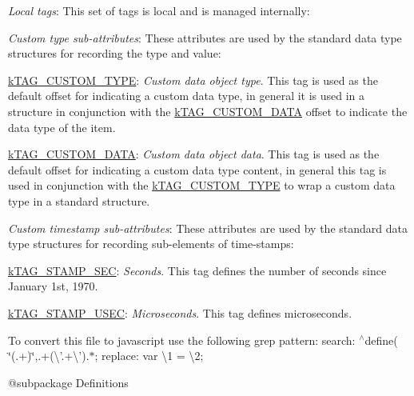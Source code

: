\begin{DoxyItemize}
\begin{DoxyItemize}
\end{DoxyItemize}
\item {\itshape Local tags}\-: This set of tags is local and is managed internally\-: 
\begin{DoxyItemize}
\item {\itshape Custom type sub-\/attributes}\-: These attributes are used by the standard data type structures for recording the type and value\-: 
\begin{DoxyItemize}
\item {\ttfamily \hyperlink{}{k\-T\-A\-G\-\_\-\-C\-U\-S\-T\-O\-M\-\_\-\-T\-Y\-P\-E}}\-: {\itshape Custom data object type}. This tag is used as the default offset for indicating a custom data type, in general it is used in a structure in conjunction with the \hyperlink{}{k\-T\-A\-G\-\_\-\-C\-U\-S\-T\-O\-M\-\_\-\-D\-A\-T\-A} offset to indicate the data type of the item. 
\item {\ttfamily \hyperlink{}{k\-T\-A\-G\-\_\-\-C\-U\-S\-T\-O\-M\-\_\-\-D\-A\-T\-A}}\-: {\itshape Custom data object data}. This tag is used as the default offset for indicating a custom data type content, in general this tag is used in conjunction with the \hyperlink{}{k\-T\-A\-G\-\_\-\-C\-U\-S\-T\-O\-M\-\_\-\-T\-Y\-P\-E} to wrap a custom data type in a standard structure. 
\end{DoxyItemize}
\item {\itshape Custom timestamp sub-\/attributes}\-: These attributes are used by the standard data type structures for recording sub-\/elements of time-\/stamps\-: 
\begin{DoxyItemize}
\item {\ttfamily \hyperlink{}{k\-T\-A\-G\-\_\-\-S\-T\-A\-M\-P\-\_\-\-S\-E\-C}}\-: {\itshape Seconds}. This tag defines the number of seconds since January 1st, 1970. 
\item {\ttfamily \hyperlink{}{k\-T\-A\-G\-\_\-\-S\-T\-A\-M\-P\-\_\-\-U\-S\-E\-C}}\-: {\itshape Microseconds}. This tag defines microseconds. 
\end{DoxyItemize}
\end{DoxyItemize}
\end{DoxyItemize}

To convert this file to javascript use the following grep pattern\-: {\ttfamily  search\-: $^\wedge$define( \char`\"{}(.+)\char`\"{},.+(\textbackslash{}'.+\textbackslash{}').$\ast$; replace\-: var \textbackslash{}1 = \textbackslash{}2; }

\begin{DoxyVerb} @subpackage        Definitions
\end{DoxyVerb}


